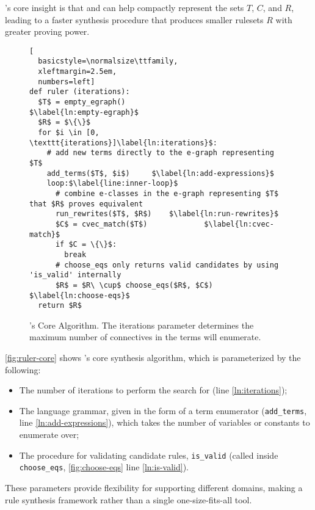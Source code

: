 's core insight is that \egraphs and \eqsat can help
 compactly represent the sets $T$, $C$, and $R$, leading
 to a faster synthesis procedure that produces smaller
 rulesets $R$ with greater proving power.

\begin{figure}
\begin{lstlisting}[
  basicstyle=\normalsize\ttfamily,
  xleftmargin=2.5em,
  numbers=left]
def ruler (iterations):
  $T$ = empty_egraph()                            $\label{ln:empty-egraph}$
  $R$ = $\{\}$
  for $i \in [0, \texttt{iterations}]\label{ln:iterations}$:
    # add new terms directly to the e-graph representing $T$
    add_terms($T$, $i$)     $\label{ln:add-expressions}$
    loop:$\label{line:inner-loop}$
      # combine e-classes in the e-graph representing $T$ that $R$ proves equivalent
      run_rewrites($T$, $R$)    $\label{ln:run-rewrites}$
      $C$ = cvec_match($T$)             $\label{ln:cvec-match}$
      if $C = \{\}$:
        break
      # choose_eqs only returns valid candidates by using 'is_valid' internally
      $R$ = $R\ \cup$ choose_eqs($R$, $C$)                 $\label{ln:choose-eqs}$
  return $R$
\end{lstlisting}
  \caption{
  's Core Algorithm.
  The \textsf{iterations} parameter
  determines the maximum
  number of connectives in the terms
   will enumerate.
  }
  \label{fig:ruler-core}
\end{figure}

\autoref{fig:ruler-core} shows 's core
  synthesis algorithm,
  which is parameterized by the following:
\begin{itemize}
    \item The number of iterations to perform the search for (line \ref{ln:iterations});

    \item The language grammar, given in the form of a term enumerator
          (\lstinline{add_terms}, line \ref{ln:add-expressions}),
          which takes the number of variables or constants to enumerate over;
\item The procedure for validating candidate rules, \lstinline{is_valid}
          (called inside \lstinline{choose_eqs}, \autoref{fig:choose-eqs} line \ref{ln:is-valid}).
\end{itemize}

These parameters provide flexibility for
 supporting different domains,
 making  a rule synthesis framework
 rather than a single one-size-fits-all tool.




